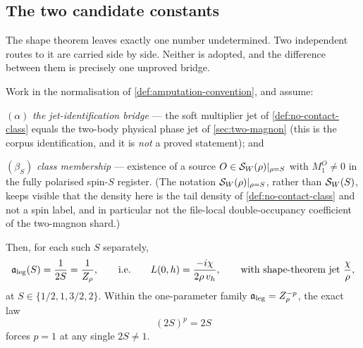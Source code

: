 
\subsection{The two candidate constants}

The shape theorem leaves exactly one number undetermined. Two independent
routes to it are carried side by side. Neither is adopted, and the difference
between them is precisely one unproved bridge.

\begin{theorem}
\label{thm:d24-val}
\statusProvedConditional

Work in the normalisation of \cref{def:amputation-convention}, and assume:

$(\alpha)$ \emph{the jet-identification bridge} --- the soft multiplier jet of
\cref{def:no-contact-class} equals the two-body physical phase jet of
\cref{sec:two-magnon} (this is the corpus identification, and it is
\emph{not} a proved statement); and

$(\beta_S)$ \emph{class membership} --- existence of a source
$O\in\mathcal{S}_W(\rho)|_{\rho=S}$ with $M_1^O\neq0$ in the fully polarised
spin-$S$ register. (The notation $\mathcal{S}_W(\rho)|_{\rho=S}$, rather than
$\mathcal{S}_W(S)$, keeps visible that the density here is the tail density of
\cref{def:no-contact-class} and not a spin label, and in particular not the
file-local double-occupancy coefficient of the two-magnon shard.)

Then, for each such $S$ separately,
\begin{equation}
  \mathfrak{a}_{\mathrm{leg}}(S)=\frac{1}{2S}=\frac{1}{Z_\rho},
  \qquad\text{i.e.}\qquad
  L(0,h)=\frac{-i\chi}{2\rho\,v_h},
  \qquad\text{with shape-theorem jet } \frac{\chi}{\rho},
  \label{eq:d24-val}
\end{equation}
at $S\in\{1/2,1,3/2,2\}$. Within the one-parameter family
$\mathfrak{a}_{\mathrm{leg}}=Z_\rho^{-p}$, the exact law
\begin{equation}
  (2S)^p=2S
  \label{eq:power-law}
\end{equation}
forces $p=1$ at any single $2S\neq1$.
\end{theorem}

